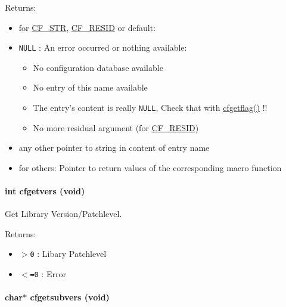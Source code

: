 \begin{Desc}
\item[Returns:]\begin{itemize}
\item for \hyperlink{group__special__options__mask_g64c30a2865061d0c1074bc6ec91e3dcf}{CF\_\-STR}, \hyperlink{group__special__options__mask_g5415b257c706aae33d91d3947a3429c0}{CF\_\-RESID} or default:\end{itemize}
\begin{itemize}
\item {\tt NULL} : An error occurred or nothing available:\begin{itemize}
\item No configuration database available\item No entry of this name available\item The entry's content is really {\tt NULL}, Check that with \hyperlink{group__retrieval_gc0188464b59267e14b5c44efb1d4a0f2}{cfgetflag()} !!\item No more residual argument (for \hyperlink{group__special__options__mask_g5415b257c706aae33d91d3947a3429c0}{CF\_\-RESID})\end{itemize}
\end{itemize}
\begin{itemize}
\item any other pointer to string in content of entry name\end{itemize}
\begin{itemize}
\item for others: Pointer to return values of the corresponding macro function \end{itemize}
\end{Desc}
\hypertarget{group__retrieval_gc4e376e3630e9b25655ee0e0b1a54a5b}{
\paragraph[{cfgetvers}]{\setlength{\rightskip}{0pt plus 5cm}int cfgetvers (void)}\hfill}
\label{group__retrieval_gc4e376e3630e9b25655ee0e0b1a54a5b}


Get Library Version/Patchlevel. 

\begin{Desc}
\item[Returns:]\begin{itemize}
\item {\tt $>$0} : Libary Patchlevel \item {\tt $<$=0} : Error \end{itemize}
\end{Desc}
\hypertarget{group__retrieval_gbd4ca2adbcac9eef4d1363424e440662}{
\paragraph[{cfgetsubvers}]{\setlength{\rightskip}{0pt plus 5cm}char$\ast$ cfgetsubvers (void)}\hfill}
\label{group__retrieval_gbd4ca2adbcac9eef4d1363424e440662}


